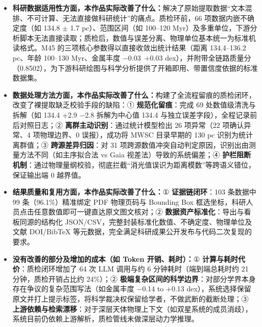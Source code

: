 \begin{itemize}[leftmargin=1.2em,itemsep=2pt]
\item \textbf{科研数据适用性方面，本作品实际改善了什么：}解决了原始提取数据“文本混排、不可计算、无法直接做科研统计”的痛点。质检环前，66 项数据内嵌不确定度（如 134.8 $\pm$ 1.7 pc）、范围区间（如 100--120 Myr）及多重单位，下游分析脚本无法直接读取；质检后，数值与误差分离、物理单位基本统一为标准机读格式。M45 的三项核心参数得以直接收敛出统计结果（距离 134.4--136.2 pc、年龄 100--130 Myr、金属丰度 $-$0.03~+0.03 dex），并附带全链路质量分（0.8502），为下游科研绘图与科学分析提供了开箱即用、带置信度依据的标准数据集。
\item \textbf{数据处理方法方面，本作品实际改善了什么：}构建了全流程留痕的质检闭环，改变了裸提取缺乏校验手段的缺陷：① \textbf{规范化留痕}：完成 69 处数值级清洗与拆解（如 134.4 +2.9 $-$2.8 拆解为中心值 134.4 与独立误差字段），全程记录前后对照日志；② \textbf{离群主动识别}：通过统计模型检出 26 项异常（22 项确认异常、4 项物理边界、0 误报），成功将 MWSC 目录早期的 130 pc 识别为统计离群值；③ \textbf{跨源差异归因}：对 31 项跨源数值冲突自动判定原因，识别出由测量方法不同（如主序拟合法 vs Gaia 视差法）导致的系统偏差；④ \textbf{护栏阻断机制}：通过物理量纲校验，彻底拦截“消光值误识为距离模数”等跨语义错位，保证输出端 0 越界值。
\item \textbf{结果质量和复用方面，本作品实际改善了什么：}① \textbf{证据链闭环}：103 条数据中 99 条（96.1\%）精准绑定 PDF 物理页码与 Bounding Box 框选坐标，科研人员点击任意数值即可一键直达原文图文核对；② \textbf{数据资产标准化}：导出与看板同源的结构化 JSON/CSV，完整封装标准化数值、不确定度、物理单位及文献 DOI/BibTeX 等元数据，完全满足科研成果公开发布与代码二次复现的要求。
\item \textbf{没有改善的部分及增加的成本（如 Token 开销、耗时）：}① \textbf{计算与耗时代价}：质检闭环增加了 64 次 LLM 调用与约 6 分钟耗时（端到端总耗时约 21 分钟，质检开销占比约 24\%）；② \textbf{极端复杂区间的科学边界}：对部分学界本身存在争议的复杂范围写法（如金属丰度 $-$0.14 to +0.13 dex），系统选择保留原文并打上提示标签，将科学裁决权保留给学者，不做武断的截断处理；③ \textbf{上游依赖与检索漂移}：对于深层天体物理上下文（如双星系统的成员消歧），系统目前仍依赖上游解析，质检管线未做深层动力学推理。
\end{itemize}
